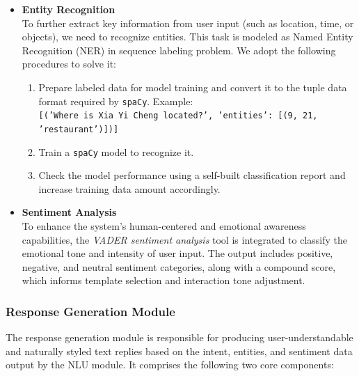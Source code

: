 \documentclass{xum_review}
\begin{document}
\begin{itemize}
\begin{enumerate}
		\end{enumerate}
		
		
		
		\item{\textbf{Entity Recognition}}\\
		To further extract key information from user input (such as location,
		time, or objects), we need to recognize entities. This task is modeled as 
		Named Entity Recognition (NER) in sequence labeling problem\citep{singh-2024}. We adopt the 
		following procedures to solve it:
		\begin{enumerate}
			\item Prepare labeled data for model training and convert it to the tuple data format required by \texttt{spaCy}. 
			Example:\\
			\texttt{[('Where is Xia Yi Cheng located?', {'entities': [(9, 21, 'restaurant')]})]}
			\item Train a \texttt{spaCy} model to recognize it.
			\item Check the model performance using a self-built classification report and increase training data amount
			accordingly.
		\end{enumerate}
		
		\item{\textbf{Sentiment Analysis}}\\
		To enhance the system's human-centered and emotional awareness
		capabilities, the \textit{VADER sentiment analysis} tool is integrated
		to classify the emotional tone and intensity of user input\citep{Hutto_Gilbert_2014}. The output
		includes positive, negative, and neutral sentiment categories, along
		with a compound score, which informs template selection and interaction
		tone adjustment.
	\end{itemize}

	\subsubsection{Response Generation Module}

	The response generation module is responsible for producing
	user-understandable and naturally styled text replies based on the intent,
	entities, and sentiment data output by the NLU module. It comprises the
	following two core components:
\end{document}
